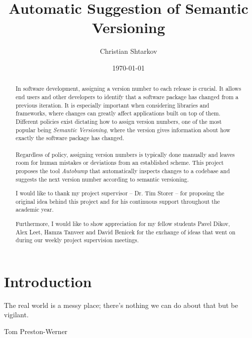 \documentclass{l4proj}
\begin{document}
\title{Automatic Suggestion of Semantic Versioning}
\author{Christian Shtarkov}
\date{\today}
\maketitle

\begin{abstract}
In software development, assigning a version number
to each release is crucial. It allows end users and other developers
to identify that a software package has changed from a previous
iteration. It is especially important when considering libraries and
frameworks, where changes can greatly affect applications built on top
of them. \\ Different policies exist dictating how to assign version
numbers, one of the most popular being \textit{Semantic
Versioning}, where the version gives
information about how exactly the software package has changed.
\\\\
Regardless of
policy, assigning version numbers is typically done manually and
leaves room for human mistakes or deviations from an established
scheme. This project proposes the tool \textit{Autobump} that automatically
inspects changes to a codebase and suggests the next version number
according to semantic versioning.
\end{abstract}

\renewcommand{\abstractname}{Acknowledgements}
\begin{abstract}
I would like to thank my project supervisor -- Dr. Tim Storer -- for
proposing the original idea behind this project and for his continuous
support throughout the academic year.

\noindent Furthermore, I would like to show appreciation for my fellow students
Pavel Dikov, Alex Leet, Hamza Tanveer and David Benicek for the
exchange of ideas that went on during our weekly project supervision
meetings.
\end{abstract}

\educationalconsent

\tableofcontents

\chapter{Introduction}

\epigraph{The real world is a messy place; there’s nothing we can do
about that but be vigilant.}{Tom Preston-Werner}
\end{document}
